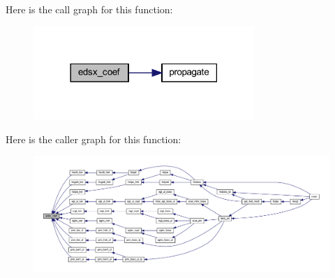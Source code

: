Here is the call graph for this function\+:\nopagebreak
\begin{figure}[H]
\begin{center}
\leavevmode
\includegraphics[width=237pt]{Leroi_8f90_a2ffa10f72b064e2c52fb28da1b335098_cgraph}
\end{center}
\end{figure}
Here is the caller graph for this function\+:\nopagebreak
\begin{figure}[H]
\begin{center}
\leavevmode
\includegraphics[width=350pt]{Leroi_8f90_a2ffa10f72b064e2c52fb28da1b335098_icgraph}
\end{center}
\end{figure}
\mbox{\label{Leroi_8f90_a1b3954d66e2114dd2d6b6a5a44b7f0a4}} 
